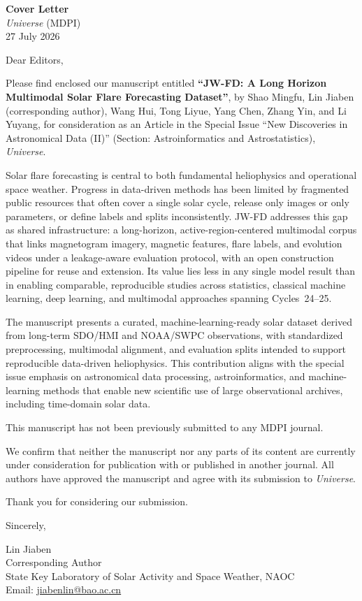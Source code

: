 \documentclass[11pt,a4paper]{article}
\begin{document}
\begin{center}
{\Large\bfseries Cover Letter}\\[0.4em]
\textit{Universe} (MDPI)\\[0.6em]
27 July 2026
\end{center}

\vspace{0.8em}

Dear Editors,

Please find enclosed our manuscript entitled
\textbf{``JW-FD: A Long Horizon Multimodal Solar Flare Forecasting Dataset''},
by Shao Mingfu, Lin Jiaben (corresponding author), Wang Hui, Tong Liyue, Yang Chen, Zhang Yin, and Li Yuyang, for consideration as an Article in the Special Issue ``New Discoveries in Astronomical Data (II)'' (Section: Astroinformatics and Astrostatistics), \textit{Universe}.

Solar flare forecasting is central to both fundamental heliophysics and operational space weather. Progress in data-driven methods has been limited by fragmented public resources that often cover a single solar cycle, release only images or only parameters, or define labels and splits inconsistently. JW-FD addresses this gap as shared infrastructure: a long-horizon, active-region-centered multimodal corpus that links magnetogram imagery, magnetic features, flare labels, and evolution videos under a leakage-aware evaluation protocol, with an open construction pipeline for reuse and extension. Its value lies less in any single model result than in enabling comparable, reproducible studies across statistics, classical machine learning, deep learning, and multimodal approaches spanning Cycles~24--25.

The manuscript presents a curated, machine-learning-ready solar dataset derived from long-term SDO/HMI and NOAA/SWPC observations, with standardized preprocessing, multimodal alignment, and evaluation splits intended to support reproducible data-driven heliophysics. This contribution aligns with the special issue emphasis on astronomical data processing, astroinformatics, and machine-learning methods that enable new scientific use of large observational archives, including time-domain solar data.

This manuscript has not been previously submitted to any MDPI journal.

We confirm that neither the manuscript nor any parts of its content are currently under consideration for publication with or published in another journal.
All authors have approved the manuscript and agree with its submission to \textit{Universe}.

Thank you for considering our submission.

\vspace{1.2em}
Sincerely,

\vspace{1.5em}
Lin Jiaben\\
Corresponding Author\\
State Key Laboratory of Solar Activity and Space Weather, NAOC\\
Email: \href{mailto:jiabenlin@bao.ac.cn}{jiabenlin@bao.ac.cn}
\end{document}
